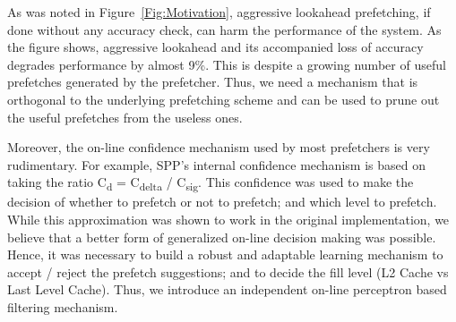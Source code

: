 

As was noted in Figure~\ref{Fig:Motivation}, aggressive lookahead
prefetching, if done without any accuracy check, can harm the
performance of the system. As the figure shows, aggressive lookahead
and its accompanied loss of accuracy degrades performance by almost
9\%.  This is despite a growing number of useful prefetches generated
by the prefetcher.  Thus, we need a mechanism that is orthogonal to
the underlying prefetching scheme and can be used to prune out the
useful prefetches from the useless ones.

Moreover, the on-line confidence mechanism used by most prefetchers is
very rudimentary. For example, SPP's internal confidence mechanism is
based on taking the ratio C\textsubscript{d} = C\textsubscript{delta}
/ C\textsubscript{sig}. This confidence was used to make the decision
of whether to prefetch or not to prefetch; and which level to
prefetch.  While this approximation was shown to work in the original
implementation, we believe that a better form of generalized on-line
decision making was possible. Hence, it was necessary to build a
robust and adaptable learning mechanism to accept / reject the
prefetch suggestions; and to decide the fill level (L2 Cache vs Last
Level Cache). Thus, we introduce an independent on-line perceptron
based filtering mechanism.

